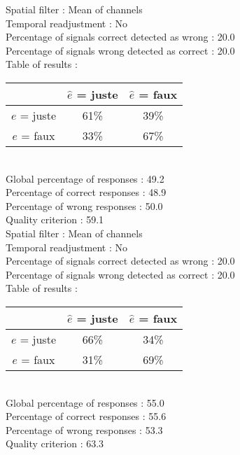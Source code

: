Spatial filter : Mean of channels \\
Temporal readjustment : No \\
Percentage of signals correct detected as wrong :   20.0 \\
Percentage of signals wrong detected as correct :   20.0 \\
Table of results : \\
\begin{tabular}{|c|c|c|}
\hline				& $\hat{e}$ = juste & $\hat{e}$ = faux \\
\hline  $e$ = juste	&     61\%			&     39\%		\\
\hline  $e$ = faux	&     33\%			&     67\%		\\
\hline
\end{tabular}\\
Global percentage of responses :   49.2 \\
Percentage of correct responses :   48.9 \\
Percentage of wrong responses :   50.0 \\
Quality criterion :   59.1 \\

Spatial filter : Mean of channels \\
Temporal readjustment : No \\
Percentage of signals correct detected as wrong :   20.0 \\
Percentage of signals wrong detected as correct :   20.0 \\
Table of results : \\
\begin{tabular}{|c|c|c|}
\hline				& $\hat{e}$ = juste & $\hat{e}$ = faux \\
\hline  $e$ = juste	&     66\%			&     34\%		\\
\hline  $e$ = faux	&     31\%			&     69\%		\\
\hline
\end{tabular}\\
Global percentage of responses :   55.0 \\
Percentage of correct responses :   55.6 \\
Percentage of wrong responses :   53.3 \\
Quality criterion :   63.3 \\

